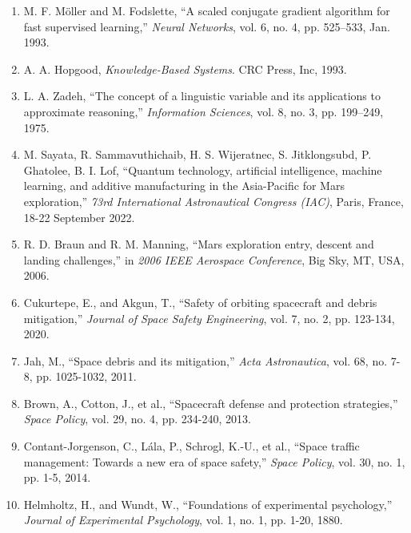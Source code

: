 \documentclass[a4paper, 11pt]{article}
\begin{document}
\begin{enumerate}
    \item M. F. Möller and M. Fodslette, “A scaled conjugate gradient algorithm for fast supervised learning,” \textit{Neural Networks}, vol. 6, no. 4, pp. 525–533, Jan. 1993.
    
    \item A. A. Hopgood, \textit{Knowledge-Based Systems}. CRC Press, Inc, 1993.
    
    \item L. A. Zadeh, “The concept of a linguistic variable and its applications to approximate reasoning,” \textit{Information Sciences}, vol. 8, no. 3, pp. 199–249, 1975.
    
    \item M. Sayata, R. Sammavuthichaib, H. S. Wijeratnec, S. Jitklongsubd, P. Ghatolee, B. I. Lof, “Quantum technology, artificial intelligence, machine learning, and additive manufacturing in the Asia-Pacific for Mars exploration,” \textit{73rd International Astronautical Congress (IAC)}, Paris, France, 18-22 September 2022.
    
    \item R. D. Braun and R. M. Manning, “Mars exploration entry, descent and landing challenges,” in \textit{2006 IEEE Aerospace Conference}, Big Sky, MT, USA, 2006.
    
    \item Cukurtepe, E., and Akgun, T., “Safety of orbiting spacecraft and debris mitigation,” \textit{Journal of Space Safety Engineering}, vol. 7, no. 2, pp. 123-134, 2020.
    
    \item Jah, M., “Space debris and its mitigation,” \textit{Acta Astronautica}, vol. 68, no. 7-8, pp. 1025-1032, 2011.
    
    \item Brown, A., Cotton, J., et al., “Spacecraft defense and protection strategies,” \textit{Space Policy}, vol. 29, no. 4, pp. 234-240, 2013.
    
    \item Contant-Jorgenson, C., Lála, P., Schrogl, K.-U., et al., “Space traffic management: Towards a new era of space safety,” \textit{Space Policy}, vol. 30, no. 1, pp. 1-5, 2014.
    
    \item Helmholtz, H., and Wundt, W., “Foundations of experimental psychology,” \textit{Journal of Experimental Psychology}, vol. 1, no. 1, pp. 1-20, 1880.
    

\end{enumerate}
\end{document}

